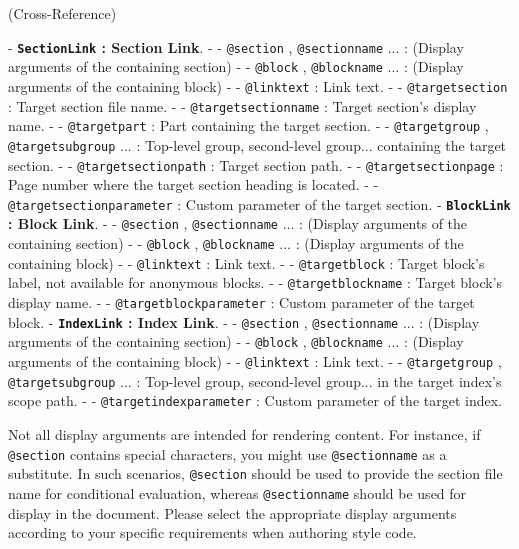 (\large Cross-Reference){
    \par\medskip{}
    - \textbf{\texttt{SectionLink} : Section Link}.
        - - \texttt{@section} , \texttt{@sectionname} ... : (Display arguments of the containing section)
        - - \texttt{@block} , \texttt{@blockname} ... : (Display arguments of the containing block)
        - - \texttt{@linktext} : Link text.
        - - \texttt{@targetsection} : Target section file name.
        - - \texttt{@targetsectionname} : Target section's display name.
        - - \texttt{@targetpart} : Part containing the target section.
        - - \texttt{@targetgroup} , \texttt{@targetsubgroup} ... : Top-level group, second-level group... containing the target section.
        - - \texttt{@targetsectionpath} : Target section path.
        - - \texttt{@targetsectionpage} : Page number where the target section heading is located.
        - - \texttt{@targetsectionparameter} : Custom parameter of the target section.
    \newpage{}
    - \textbf{\texttt{BlockLink} : Block Link}.
        - - \texttt{@section} , \texttt{@sectionname} ... : (Display arguments of the containing section)
        - - \texttt{@block} , \texttt{@blockname} ... : (Display arguments of the containing block)
        - - \texttt{@linktext} : Link text.
        - - \texttt{@targetblock} : Target block's label, not available for anonymous blocks.
        - - \texttt{@targetblockname} : Target block's display name.
        - - \texttt{@targetblockparameter} : Custom parameter of the target block.
    - \textbf{\texttt{IndexLink} : Index Link}.
        - - \texttt{@section} , \texttt{@sectionname} ... : (Display arguments of the containing section)
        - - \texttt{@block} , \texttt{@blockname} ... : (Display arguments of the containing block)
        - - \texttt{@linktext} : Link text.
        - - \texttt{@targetgroup} , \texttt{@targetsubgroup} ... : Top-level group, second-level group... in the target index's scope path.
        - - \texttt{@targetindexparameter} : Custom parameter of the target index.
}

Not all display arguments are intended for rendering content. For instance, if \texttt{@section} contains special characters, you might use \texttt{@sectionname} as a substitute. In such scenarios, \texttt{@section} should be used to provide the section file name for conditional evaluation, whereas \texttt{@sectionname} should be used for display in the document. Please select the appropriate display arguments according to your specific requirements when authoring style code.

